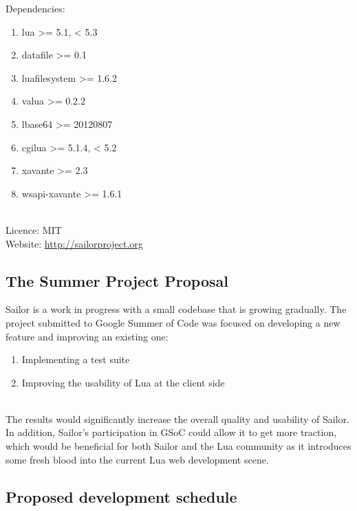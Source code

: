 \documentclass{article}
\begin{document}
Dependencies:
\begin{enumerate}\item lua >= 5.1, < 5.3
\item datafile >= 0.1
\item luafilesystem >= 1.6.2
\item valua >= 0.2.2
\item lbase64 >= 20120807
\item cgilua >= 5.1.4, < 5.2
\item xavante >= 2.3
\item wsapi-xavante >= 1.6.1 
\end{enumerate}\\

Licence: MIT\\

Website: \url{http://sailorproject.org}\\

\subsection{The Summer Project Proposal}

Sailor is a work in progress with a small codebase that is growing gradually. The project submitted to Google Summer of Code was focused on developing a new feature and improving an existing one: \\

\begin{enumerate}\item Implementing a test suite
\item Improving the usability of Lua at the client side
\end{enumerate}\item \\

The results would significantly increase the overall quality and usability of Sailor. In addition, Sailor's participation in GSoC could allow it to get more traction, which would be beneficial for both Sailor and the Lua community as it introduces some fresh blood into the current Lua web development scene. 

\subsection{Proposed development schedule}
\end{document}
